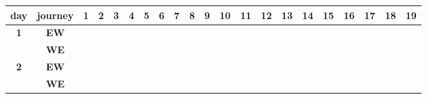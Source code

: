 \documentclass[a4,11pt,twocolumn]{article}
\begin{document}
\begin{table}[h]
\centering

\begin{tabular}{|c|c|*{19}{l|}}
\hline
\multicolumn{1}{|l|}{\textbf{day}} & \textbf{journey}   & 1                        & 2                        & 3                        & 4                        & 5                        & 6                        & 7                        & 8                        & 9                        & 10                       & 11                       & 12                       & 13                       & 14                       & 15                       & 16                       & 17                       & 18                       & 19                       \\ \hline
\multirow{2}{*}{\textbf{1}} & \textbf{EW} & \cellcolor[HTML]{F56B00} & \cellcolor[HTML]{F56B00} & \cellcolor[HTML]{5AB25A} & \cellcolor[HTML]{FFCB2F} & \cellcolor[HTML]{FFCB2F} & \cellcolor[HTML]{F56B00} & \cellcolor[HTML]{FFCB2F} & \cellcolor[HTML]{5AB25A} & \cellcolor[HTML]{F56B00} & \cellcolor[HTML]{5AB25A} & \cellcolor[HTML]{FFCB2F} & \cellcolor[HTML]{F56B00} & \cellcolor[HTML]{FFCB2F} & \cellcolor[HTML]{FFCB2F} & \cellcolor[HTML]{F56B00} & \cellcolor[HTML]{9A0000} & \cellcolor[HTML]{FFCB2F} & \cellcolor[HTML]{F56B00} & \cellcolor[HTML]{5AB25A} \\
\cline{2-20}
 & \textbf{WE} & \cellcolor[HTML]{F56B00} & \cellcolor[HTML]{F56B00} &                          & \cellcolor[HTML]{FFCB2F} & \cellcolor[HTML]{FFCB2F} & \cellcolor[HTML]{FFCB2F} & \cellcolor[HTML]{FFCB2F} & \cellcolor[HTML]{FFCB2F} & \cellcolor[HTML]{F56B00} & \cellcolor[HTML]{F56B00} & \cellcolor[HTML]{FFCB2F} & \cellcolor[HTML]{F56B00} & \cellcolor[HTML]{FFCB2F} & \cellcolor[HTML]{FFCB2F} & \cellcolor[HTML]{9A0000} & \cellcolor[HTML]{9A0000} & \cellcolor[HTML]{FFCB2F} & \cellcolor[HTML]{F56B00} &  \\
 \hline
\multirow{2}{*}{\textbf{2}} & \textbf{EW} & \cellcolor[HTML]{F56B00} & \cellcolor[HTML]{F56B00} & \cellcolor[HTML]{5AB25A} & \cellcolor[HTML]{FFCB2F} & \cellcolor[HTML]{FFCB2F} & \cellcolor[HTML]{FFCB2F} & \cellcolor[HTML]{FFCB2F} & \cellcolor[HTML]{FFCB2F} & \cellcolor[HTML]{F56B00} & \cellcolor[HTML]{F56B00} & \cellcolor[HTML]{FFCB2F} & \cellcolor[HTML]{F56B00} & \cellcolor[HTML]{FFCB2F} & \cellcolor[HTML]{F56B00} & \cellcolor[HTML]{9A0000} & \cellcolor[HTML]{9A0000} & \cellcolor[HTML]{FFCB2F} & \cellcolor[HTML]{F56B00} & \cellcolor[HTML]{5AB25A} \\
\cline{2-20}
 & \textbf{WE} & \cellcolor[HTML]{F56B00} & \cellcolor[HTML]{F56B00} & \cellcolor[HTML]{5AB25A} & \cellcolor[HTML]{FFCB2F} & \cellcolor[HTML]{FFCB2F} & \cellcolor[HTML]{FFCB2F} & \cellcolor[HTML]{FFCB2F} & \cellcolor[HTML]{FFCB2F} & \cellcolor[HTML]{F56B00} & \cellcolor[HTML]{FFCB2F} & \cellcolor[HTML]{FFCB2F} & \cellcolor[HTML]{FFCB2F} & \cellcolor[HTML]{FFCB2F} & \cellcolor[HTML]{FFCB2F} & \cellcolor[HTML]{9A0000} & \cellcolor[HTML]{9A0000} & \cellcolor[HTML]{FFCB2F} & \cellcolor[HTML]{9A0000} & \cellcolor[HTML]{5AB25A} \\ \hline
\end{tabular}


\end{table}
\end{document}
